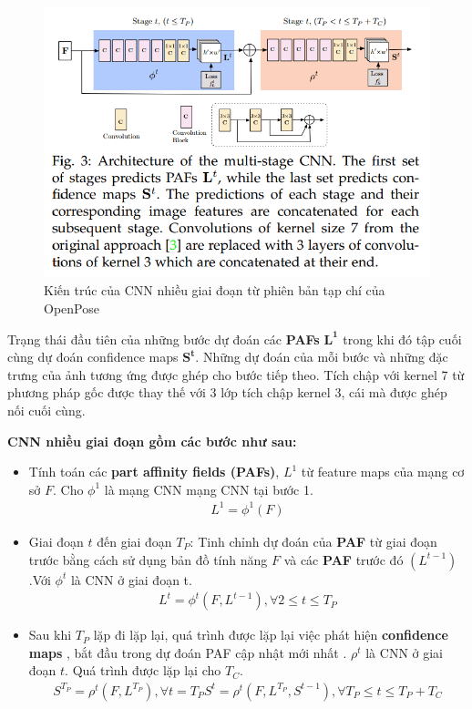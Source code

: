 \begin{itemize}
\FloatBarrier
\begin{figure}[htp]
\begin{center}
\includegraphics[scale=0.65]{chap3/c3_figs/CNN_m.png}
\end{center}
\caption{Kiến trúc của CNN nhiều giai đoạn từ phiên bản tạp chí của OpenPose}
\label{fig:CNN_multi_stage}
\end{figure}
\FloatBarrier

Trạng thái đầu tiên của những bước dự đoán các \textbf{PAFs} $\mathbf{L^{1}}$ trong khi đó tập cuối cùng dự đoán confidence maps $\mathbf{S^t}$. Những dự đoán của mỗi bước và những đặc trưng của ảnh tương ứng được ghép cho bước tiếp theo. Tích chập với kernel 7 từ phương pháp gốc được thay thế với 3 lớp tích chập kernel 3, cái mà được ghép nối cuối cùng.

\textbf{CNN nhiều giai đoạn gồm các bước như sau:}
\begin{itemize}
\item Tính toán các \textbf{part affinity fields (PAFs)}, $ L^{1}$ từ feature maps của mạng cơ sở $F$. Cho $\phi^1$ là mạng CNN mạng CNN tại bước 1. 
\begin{align}
L^1 = \phi^1(F)
\end{align}
\item Giai đoạn $t$ đến giai đoạn $T_P$: Tinh chỉnh dự đoán của \textbf{PAF} từ giai đoạn trước bằng cách sử dụng bản đồ tính năng $F$ và các \textbf{PAF} trước đó $(L^{t-1})$.Với $\phi^t$ là CNN ở giai đoạn t.
\begin{align}
L^t = \phi^t(F, L^{t-1}), \forall 2 \leq t \leq T_P
\end{align}
\item Sau khi $T_P$ lặp đi lặp lại, quá trình được lặp lại việc phát hiện \textbf{confidence maps} , bắt đầu trong dự đoán PAF cập nhật mới nhất . $\rho^t$ là CNN ở giai đoạn $t$. Quá trình được lặp lại cho $T_C$.
\begin{align}
S^{T_P} = \rho^t(F, L^{T_P}), \forall t = T_P
S^t = \rho^t(F, L^{T_P}, S^{t-1}), \forall T_P \leq t \leq T_P + T_C
\end{align}


\end{itemize}
\end{itemize}
